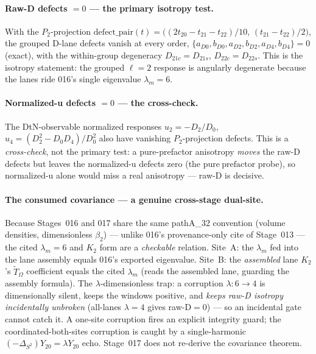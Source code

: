 \paragraph{Raw-D defects \texorpdfstring{\(=0\)}{= 0} --- the primary isotropy test.}
With the \(P_2\)-projection \(\mathrm{defect\_pair}(t)=\big((2t_{20}-t_{21}-t_{22})/10,\,
(t_{21}-t_{22})/2\big)\), the grouped D-lane defects vanish at every order,
\(\{a_{D0},b_{D0},a_{D2},b_{D2},a_{D4},b_{D4}\}=0\) (exact), with the within-group degeneracy
\(D_{21c}=D_{21s}\), \(D_{22c}=D_{22s}\). This is the isotropy statement: the grouped \(\ell=2\)
response is angularly degenerate because the lanes ride 016's single eigenvalue \(\lambda_m=6\).

\paragraph{Normalized-u defects \texorpdfstring{\(=0\)}{= 0} --- the cross-check.}
The DtN-observable normalized responses \(u_2=-D_2/D_0\), \(u_4=(D_2^2-D_0 D_4)/D_0^2\) also have
vanishing \(P_2\)-projection defects. This is a \emph{cross-check}, not the primary test: a
pure-prefactor anisotropy \emph{moves} the raw-D defects but leaves the normalized-u defects zero
(the \(\mathrm{pure\ prefactor}\) probe), so normalized-u alone would miss a real anisotropy ---
raw-D is decisive.

\paragraph{The consumed covariance --- a genuine cross-stage dual-site.}
Because Stages~016 and 017 share the same pathA\_32 convention (volume densities, dimensionless
\(\beta_2\)) --- unlike 016's provenance-only cite of Stage~013 --- the cited \(\lambda_m=6\) and
\(K_2\) form are a \emph{checkable} relation. Site~A: the \(\lambda_m\) fed into the lane assembly
equals 016's exported eigenvalue. Site~B: the \emph{assembled} lane \(K_2\)'s \(\tilde T_\Omega\)
coefficient equals the cited \(\lambda_m\) (reads the assembled lane, guarding the assembly formula).
The \(\lambda\)-dimensionless trap: a corruption \(\lambda:6\to4\) is dimensionally silent, keeps
the windows positive, and \emph{keeps raw-D isotropy incidentally unbroken} (all-lanes \(\lambda=4\)
gives raw-D\(=0\)) --- so an incidental gate cannot catch it. A one-site corruption fires an explicit
integrity guard; the coordinated-both-sites corruption is caught by a single-harmonic
\((-\Delta_{S^2})Y_{20}=\lambda Y_{20}\) echo. Stage~017 does not re-derive the covariance theorem.

